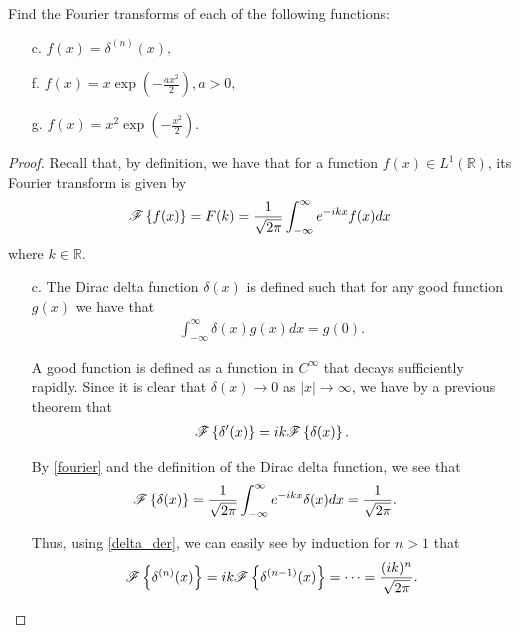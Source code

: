 \begin{problem}{2.1}
  Find the Fourier transforms of each of the following functions:
  \begin{enumerate}
    \item [c.] $f(x) = \delta ^{(n)}(x),$
    \item [f.] $\displaystyle f(x) = x \exp \left( -\frac{a x^2}{2} \right), a > 0,$
    \item [g.] $\displaystyle f(x) = x^2 \exp \left( -\frac{x^2}{2} \right).$
  \end{enumerate}
\end{problem}

\begin{proof}
  Recall that, by definition, we have that for a function $f(x) \in L^1(\mathbb{R})$,
  its Fourier transform is given by
  \begin{align}\label{fourier}
    \mathscr{F}\left\{ {f(x)} \right\} = F(k) = \frac{1}{\sqrt{2 \pi}} \int_{-\infty}^{\infty} e^{-ikx}f(x) dx
  \end{align}
  where $k\in\mathbb{R}$.

  \begin{enumerate}
    \item [c.] The Dirac delta function $\delta(x)$ is defined such that for any good function $g(x)$ we have that
      \begin{align*}
        \int_{-\infty}^{\infty} \delta(x) g(x) dx = g(0).
      \end{align*}

      A good function is defined as a function in $C^{\infty}$ that decays sufficiently rapidly.
      Since it is clear that $\delta(x) \to 0$ as $|x| \to \infty$, we have by a previous theorem that
      \begin{align}\label{delta_der}
        \mathscr{F}\left\{ {\delta'(x)} \right\} = ik \mathscr{F}\left\{ {\delta(x)} \right\}.
      \end{align}

      By \eqref{fourier} and the definition of the Dirac delta function, we see that
      \begin{align*}
        \mathscr{F}\left\{ {\delta(x)} \right\} &= \frac{1}{\sqrt{2\pi}}\int_{-\infty}^{\infty} e^{- i k x}\delta(x) dx = \frac{1}{\sqrt{2\pi}}.
      \end{align*}

      Thus, using \eqref{delta_der}, we can easily see by induction for $n > 1$ that
      \begin{align*}
        \mathscr{F}\left\{ {\delta^{(n)}(x)} \right\} = ik \mathscr{F}\left\{ {\delta^{(n-1)}(x)} \right\} = \dots = \frac{(ik)^n}{\sqrt{2 \pi}}.
      \end{align*}


\end{enumerate}
\end{proof}
